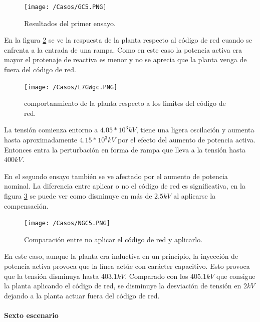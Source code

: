 \documentclass{book}
\begin{document}
\begin{figure}[h!]
\centering
\texttt{[image: /Casos/GC5.PNG]}
\caption{Resultados del primer ensayo. }
\label{GC5}
\end{figure} \par

En la figura \ref{L7GWgc} se ve la respuesta de la planta respecto al c\'odigo de red cuando se enfrenta a la entrada de una rampa. Como en este caso la potencia activa era mayor el protenaje de reactiva es menor y no se aprecia que la planta venga de fuera del c\'odigo de red. \par
 
\begin{figure}[h!]
\centering
\texttt{[image: /Casos/L7GWgc.PNG]}
\caption{comportanmiento de la planta respecto a los limites del c\'odigo de red. }
\label{L7GWgc}
\end{figure} \par

La tensi\'on comienza entorno a $4.05 * 10^3 kV$, tiene una ligera oscilaci\'on y aumenta hasta aproximadamente $4.15* 10^3 kV$ por el efecto del aumento de potencia activa. Entonces entra la perturbaci\'on en forma de rampa que lleva a la tensi\'on hasta $400 kV$. 

En el segundo ensayo tambi\'en se ve afectado por el aumento de potencia nominal. La diferencia entre aplicar o no el c\'odigo de red es significativa, en la figura \ref{NGC5} se puede ver como disminuye en m\'as de $2.5kV$ al aplicarse  la compensaci\'on. \par

\begin{figure}[h!]
\centering
\texttt{[image: /Casos/NGC5.PNG]}
\caption{Comparaci\'on entre no aplicar el c\'odigo de red y aplicarlo. }
\label{NGC5}
\end{figure} \par

En este caso, aunque la planta era inductiva en un principio, la inyecci\'on de potencia activa provoca que la l\'inea act\'ue con car\'acter capacitivo. Esto provoca que la tensi\'on disminuya hasta $403.1 kV$. Comparado con los $405.1 kV$ que consigue la planta aplicando el c\'odigo de red, se disminuye la desviaci\'on de tensi\'on en $2kV$ dejando a la planta actuar fuera del c\'odigo de red. 

	\paragraph{Sexto escenario}
\end{document}
